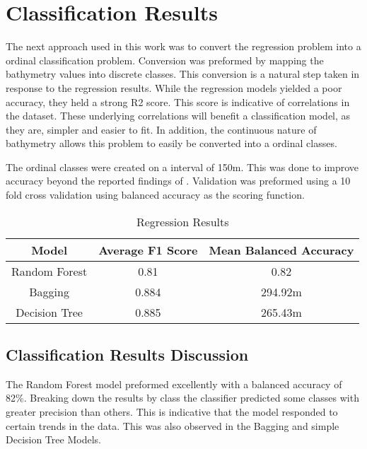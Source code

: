 \section{Classification Results}
\setlength{\parindent}{10ex}
The next approach used in this work was to convert the regression problem into a ordinal classification problem.
Conversion was preformed by mapping the bathymetry values into discrete classes.
This conversion is a natural step taken in response to the regression results.
While the regression models yielded a poor accuracy, they held a strong R2 score.
This score is indicative of correlations in the dataset.
These underlying correlations will benefit a classification model, as they are, simpler and easier to fit.
In addition, the continuous nature of bathymetry allows this problem to easily be converted into a ordinal classes.

\par
The ordinal classes were created on a interval of 150m.
This was done to improve accuracy beyond the reported findings of \cite{jena2012prediction}.
Validation was preformed using a 10 fold cross validation using balanced accuracy as the scoring function.

\begin{center}
    \begin{table}[htb]
        \begin{tabular}{|c c c|}
            \hline
			\textbf{Model} & \textbf{Average F1 Score} & \textbf{Mean Balanced Accuracy} \\
			\hline
			Random Forest & 0.81 & 0.82 \\
            Bagging & 0.884 & 294.92m \\
            Decision Tree & 0.885 & 265.43m \\
			\hline
        \end{tabular}
        \label{table:CLASSIFICATION_RESULTS}
        \caption{Regression Results}
    \end{table}
\end{center}

\subsection{Classification Results Discussion}
The Random Forest model preformed excellently with a balanced accuracy of 82\%.
Breaking down the results by class the classifier predicted some classes with greater precision than others.
This is indicative that the model responded to certain trends in the data.
This was also observed in the Bagging and simple Decision Tree Models.